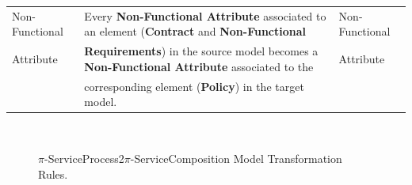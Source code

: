 \begin{table} [ht!]
\begin{tabular}{l|l|l}
	Non-Functional & Every \textbf{Non-Functional Attribute} associated to an
	element (\textbf{Contract} and \textbf{Non-Functional} &
	Non-Functional \\ Attribute &  \textbf{Requirements}) in the source model
	becomes a \textbf{Non-Functional Attribute} associated to the  &
	Attribute \\
	&corresponding element (\textbf{Policy}) in the target model. &\\
	\hline
\end{tabular}
\end{table}




\begin{figure} [ht!]
  \centering
  ~ %
  \\
  \caption{$\pi$-ServiceProcess2$\pi$-ServiceComposition Model Transformation
  Rules.}
  \label{fig:modelRulesSp2SC}
\end{figure}


